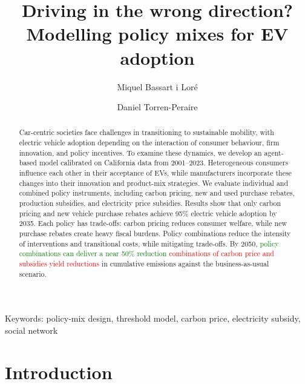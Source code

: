 \documentclass[12pt]{article}
\title{\vspace{-2.0cm}Driving in the wrong direction? Modelling policy mixes for EV adoption\\}
\date{}
\author[1,2]{Miquel Bassart i Loré}
\author[3,4,5]{Daniel Torren-Peraire}
\affil[1]{Universität Bielefeld}
\affil[2]{Université Paris 1 Panthéon-Sorbonne}
\affil[3]{Universitat Autònoma de Barcelona}
\affil[4]{Università Ca' Foscari Venezia}
\affil[5]{International Institute for Applied Systems Analysis}
\begin{document}
	
	\maketitle
	\begin{abstract}
		Car-centric societies face challenges in transitioning to sustainable mobility, with electric vehicle adoption depending on the interaction of consumer behaviour, firm innovation, and policy incentives. To examine these dynamics, we develop an agent-based model calibrated on California data from 2001–2023. Heterogeneous consumers influence each other in their acceptance of EVs, while manufacturers incorporate these changes into their innovation and product-mix strategies. We evaluate individual and combined policy instruments, including carbon pricing, new and used purchase rebates, production subsidies, and electricity price subsidies. Results show that only carbon pricing and new vehicle purchase rebates achieve 95\% electric vehicle adoption by 2035. Each policy has trade-offs: carbon pricing reduces consumer welfare, while new purchase rebates create heavy fiscal burdens. Policy combinations reduce the intensity of interventions and transitional costs, while mitigating trade-offs. By 2050, \textcolor{green}{policy combinations can deliver a near 50\% reduction} \textcolor{red}{combinations of carbon price and subsidies yield reductions} in cumulative emissions against the business-as-usual scenario.
	\end{abstract}	
	
	Keywords: policy-mix design, threshold model, carbon price, electricity subsidy, social network
	
	\section{Introduction} \label{Introduction}
  
\end{document}

